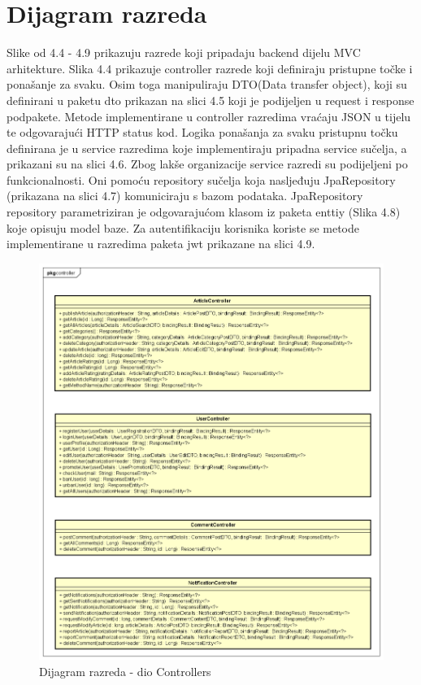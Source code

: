 \eject


\section{Dijagram razreda}

Slike od 4.4 - 4.9 prikazuju razrede koji pripadaju backend dijelu MVC arhitekture. Slika 4.4 prikazuje controller razrede koji definiraju pristupne točke i ponašanje za svaku. 
Osim toga manipuliraju DTO(Data transfer object), koji su definirani u paketu dto prikazan na slici 4.5 koji je podijeljen u request i response podpakete. 
Metode implementirane u controller razredima vraćaju JSON u tijelu te odgovarajući HTTP status kod. 
Logika ponašanja za svaku pristupnu točku definirana je u service razredima koje implementiraju pripadna service sučelja, a prikazani su na slici 4.6. 
Zbog lakše organizacije service razredi su podijeljeni po funkcionalnosti. Oni pomoću repository sučelja koja nasljeđuju JpaRepository (prikazana na slici 4.7) komuniciraju s bazom podataka.  
JpaRepository repository parametriziran je odgovarajućom klasom iz paketa enttiy (Slika 4.8) koje opisuju model baze. Za autentifikaciju korisnika koriste se metode implementirane u razredima paketa jwt prikazane na slici 4.9.

\eject

\begin{figure}[H]
	\includegraphics[scale=0.4]{slike/Class Diagram Controller1.png}
	\centering
	\caption{Dijagram razreda - dio Controllers}
	\label{fig:class_diagram_controllers}
\end{figure}

